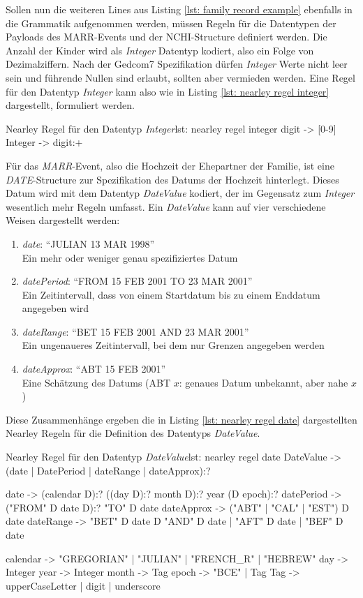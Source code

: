 Sollen nun die weiteren Lines aus Listing \ref{lst: family record example} ebenfalls in die Grammatik aufgenommen werden, müssen Regeln für die Datentypen der Payloads des MARR-Events und der NCHI-Structure definiert werden. Die Anzahl der Kinder wird als  \textit{Integer} Datentyp kodiert, also ein Folge von Dezimalziffern. Nach der Gedcom7 Spezifikation dürfen \textit{Integer} Werte nicht leer sein und führende Nullen sind erlaubt, sollten aber vermieden werden. Eine Regel für den Datentyp \textit{Integer} kann also wie in Listing \ref{lst: nearley regel integer} dargestellt, formuliert werden.
\vspace{1em}
\begin{javascript}{Nearley Regel für den Datentyp \textit{Integer}}{lst: nearley regel integer}
	digit    ->  [0-9]
	Integer  ->  digit:+
\end{javascript}
\vspace{1em}
Für das \textit{MARR}-Event, also die Hochzeit der Ehepartner der Familie, ist eine\\\textit{DATE}-Structure zur Spezifikation des Datums der Hochzeit hinterlegt. Dieses Datum wird mit dem Datentyp \textit{DateValue} kodiert, der im Gegensatz zum \textit{Integer} wesentlich mehr Regeln umfasst. Ein \textit{DateValue} kann auf vier verschiedene Weisen dargestellt werden:
\begin{enumerate}
	\item \textit{date}: ``JULIAN 13 MAR 1998''\\Ein mehr oder weniger genau spezifiziertes Datum
	\item \textit{datePeriod}: ``FROM 15 FEB 2001 TO 23 MAR 2001''\\Ein Zeitintervall, dass von einem Startdatum bis zu einem Enddatum angegeben wird
	\item \textit{dateRange}: ``BET 15 FEB 2001 AND 23 MAR 2001''\\Ein ungenaueres Zeitintervall, bei dem nur Grenzen angegeben werden
	\item \textit{dateApprox}: ``ABT 15 FEB 2001''\\Eine Schätzung des Datums (ABT $x$: genaues Datum unbekannt, aber nahe $x$)
\end{enumerate}
Diese Zusammenhänge ergeben die in Listing \ref{lst: nearley regel date} dargestellten Nearley Regeln für die Definition des Datentyps \textit{DateValue}.
\vspace{1em}
\begin{javascript}{Nearley Regel für den Datentyp \textit{DateValue}}{lst: nearley regel date}
	DateValue   ->  (date | DatePeriod | dateRange | dateApprox):?
		
	date		->  (calendar  D):?  
					((day  D):?  month  D):?  
					year  
					(D  epoch):?
	datePeriod  ->  ("FROM"  D  date  D):?  "TO"  D  date
	dateApprox  ->  ("ABT" | "CAL" | "EST")  D  date 
	dateRange   ->  "BET"  D  date  D  "AND"  D  date  
					|   "AFT"  D  date  
					|   "BEF"  D  date 
	
	calendar 	->  "GREGORIAN" | "JULIAN" | "FRENCH_R" | "HEBREW"
	day      	->  Integer  
	year 	 	->  Integer
	month    	->  Tag
	epoch    	->  "BCE" | Tag
	Tag 		->  upperCaseLetter  |  digit  |  underscore 
\end{javascript}
